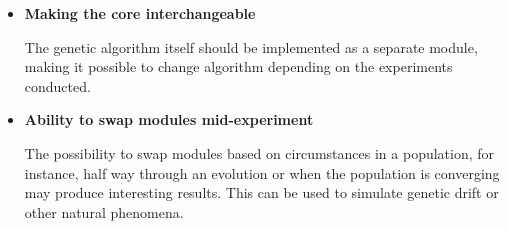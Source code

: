 \begin{itemize}
\begin{itemize}
			\item Ngene has implemented OpenMP\footnote{http://www.openmp.org/} in order to utilize multi-core CPUs. This feature was, however, disabled because the framework is not thread-safe. As multi-core CPUs are becoming more common, the framework should be able to utilize such facilities.
		\end{itemize}

	\item\textbf{Making the core interchangeable}

	The genetic algorithm itself should be implemented as a separate module, making it possible to change algorithm depending on the experiments conducted.

	\item\textbf{Ability to swap modules mid-experiment}

	The possibility to swap modules based on circumstances in a population, for instance, half way through an evolution or when the population is converging may produce interesting results. This can be used to simulate genetic drift or other natural phenomena.
\end{itemize}
